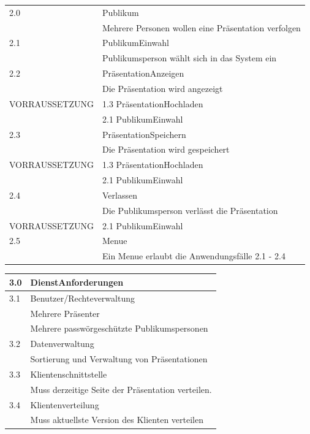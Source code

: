 \begin{tabular}{|l|l|}
	\hline
	2.0 & Publikum\\
	& Mehrere Personen wollen eine Präsentation verfolgen\\
	\hline
	\hline
	2.1 & PublikumEinwahl\\
	& Publikumsperson wählt sich in das System ein\\
	\hline
	\hline
	2.2 & PräsentationAnzeigen\\
	& Die Präsentation wird angezeigt\\
	VORRAUSSETZUNG & 1.3 PräsentationHochladen\\
	& 2.1 PublikumEinwahl\\
	\hline
	\hline
	2.3 & PräsentationSpeichern\\
	& Die Präsentation wird gespeichert\\
	VORRAUSSETZUNG & 1.3 PräsentationHochladen\\
	& 2.1 PublikumEinwahl\\
	\hline
	\hline
	2.4 & Verlassen\\
	& Die Publikumsperson verlässt die Präsentation\\
	VORRAUSSETZUNG & 2.1 PublikumEinwahl\\
	\hline
	\hline
	2.5 & Menue\\
	& Ein Menue erlaubt die Anwendungsfälle 2.1 - 2.4\\
	\hline
\end{tabular}

\begin{tabular}{|l|l|}
	\hline
	3.0 & DienstAnforderungen\\
	\hline
	\hline
	3.1 & Benutzer/Rechteverwaltung\\
	& Mehrere Präsenter\\
	& Mehrere passwörgeschützte Publikumspersonen\\
	\hline
	\hline
	3.2 & Datenverwaltung\\
	& Sortierung und Verwaltung von Präsentationen\\
	\hline
	\hline
	3.3 & Klientenschnittstelle\\
	& Muss derzeitige Seite der Präsentation verteilen.\\
	\hline
	\hline
	3.4 & Klientenverteilung\\
	& Muss aktuellste Version des Klienten verteilen\\
	\hline
\end{tabular}

